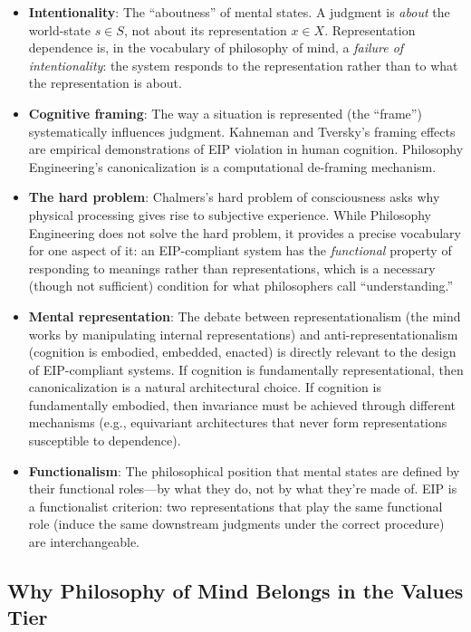 \documentclass[12pt,letterpaper]{article}
\theoremstyle{definition}
\theoremstyle{plain}
\begin{document}
\begin{itemize}
    \item \textbf{Intentionality}: The ``aboutness'' of mental states. A judgment is \emph{about} the world-state $s \in S$, not about its representation $x \in X$. Representation dependence is, in the vocabulary of philosophy of mind, a \emph{failure of intentionality}: the system responds to the representation rather than to what the representation is about.

    \item \textbf{Cognitive framing}: The way a situation is represented (the ``frame'') systematically influences judgment. Kahneman and Tversky's framing effects are empirical demonstrations of EIP violation in human cognition. Philosophy Engineering's canonicalization is a computational de-framing mechanism.

    \item \textbf{The hard problem}: Chalmers's hard problem of consciousness asks why physical processing gives rise to subjective experience. While Philosophy Engineering does not solve the hard problem, it provides a precise vocabulary for one aspect of it: an EIP-compliant system has the \emph{functional} property of responding to meanings rather than representations, which is a necessary (though not sufficient) condition for what philosophers call ``understanding.''

    \item \textbf{Mental representation}: The debate between representationalism (the mind works by manipulating internal representations) and anti-representationalism (cognition is embodied, embedded, enacted) is directly relevant to the design of EIP-compliant systems. If cognition is fundamentally representational, then canonicalization is a natural architectural choice. If cognition is fundamentally embodied, then invariance must be achieved through different mechanisms (e.g., equivariant architectures that never form representations susceptible to dependence).

    \item \textbf{Functionalism}: The philosophical position that mental states are defined by their functional roles---by what they do, not by what they're made of. EIP is a functionalist criterion: two representations that play the same functional role (induce the same downstream judgments under the correct procedure) are interchangeable.
\end{itemize}

\subsection{Why Philosophy of Mind Belongs in the Values Tier}
\end{document}
